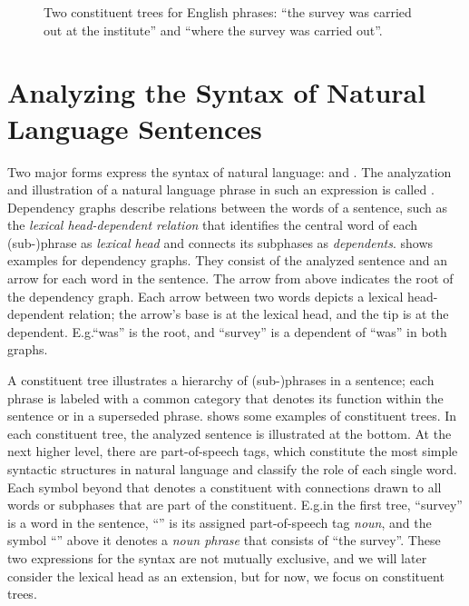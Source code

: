\documentclass[../document.tex]{subfiles}
\begin{document}
    \begin{figure}
        \null\hfill
        
        \hfill
        
        \hfill\null
        \caption{\label{fig:constituent}
            Two constituent trees for English phrases: ``the survey was carried out at the institute'' and ``where the survey was carried out''.
        }
    \end{figure}
    
    \section*{Analyzing the Syntax of Natural Language Sentences}
    Two major forms express the syntax of natural language:  and .
    The analyzation and illustration of a natural language phrase in such an expression is called .
    Dependency graphs describe relations between the words of a sentence, such as the \emph{lexical head-dependent relation} that identifies the central word of each (sub-)phrase as \emph{lexical head} and connects its subphases as \emph{dependents}. \citep[Section~18.1]{Jur23}
     shows examples for dependency graphs.
    They consist of the analyzed sentence and an arrow for each word in the sentence.
    The arrow from above indicates the root of the dependency graph.
    Each arrow between two words depicts a lexical head-dependent relation; the arrow's base is at the lexical head, and the tip is at the dependent.
    E.g.\@ ``was'' is the root, and ``survey'' is a dependent of ``was'' in both graphs. 
            
    A constituent tree illustrates a hierarchy of (sub-)phrases in a sentence; each phrase is labeled with a common category that denotes its function within the sentence or in a superseded phrase.
     shows some examples of constituent trees.
    In each constituent tree, the analyzed sentence is illustrated at the bottom.
    At the next higher level, there are part-of-speech tags, which constitute the most simple syntactic structures in natural language and classify the role of each single word.
    Each symbol beyond that denotes a constituent with connections drawn to all words or subphases that are part of the constituent.
    E.g.\@ in the first tree, ``survey'' is a word in the sentence, ``'' is its assigned part-of-speech tag \emph{noun}, and the symbol ``'' above it denotes a \emph{noun phrase} that consists of ``the survey''.
    These two expressions for the syntax are not mutually exclusive, and we will later consider the lexical head as an extension, but for now, we focus on constituent trees.
    
\end{document}
